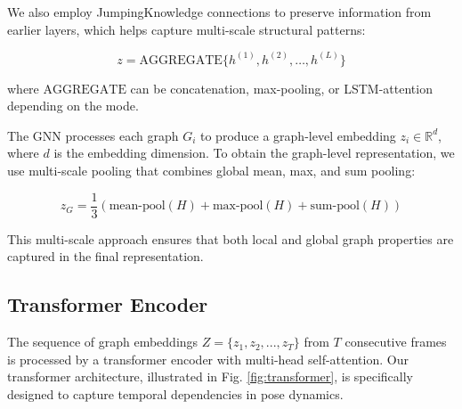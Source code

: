 \documentclass[conference]{IEEEtran}
\begin{document}
We also employ JumpingKnowledge connections \cite{xu2018representation} to preserve information from earlier layers, which helps capture multi-scale structural patterns:

\begin{equation}
z = \text{AGGREGATE}\{h^{(1)}, h^{(2)}, \ldots, h^{(L)}\}
\end{equation}

where $\text{AGGREGATE}$ can be concatenation, max-pooling, or LSTM-attention depending on the mode.

The GNN processes each graph $G_i$ to produce a graph-level embedding $z_i \in \mathbb{R}^d$, where $d$ is the embedding dimension. To obtain the graph-level representation, we use multi-scale pooling that combines global mean, max, and sum pooling:

\begin{equation}
z_G = \frac{1}{3}\left(\text{mean-pool}(H) + \text{max-pool}(H) + \text{sum-pool}(H)\right)
\end{equation}

This multi-scale approach ensures that both local and global graph properties are captured in the final representation.

\subsection{Transformer Encoder}
The sequence of graph embeddings $Z = \{z_1, z_2, ..., z_T\}$ from $T$ consecutive frames is processed by a transformer encoder with multi-head self-attention. Our transformer architecture, illustrated in Fig. \ref{fig:transformer}, is specifically designed to capture temporal dependencies in pose dynamics.
\end{document}
